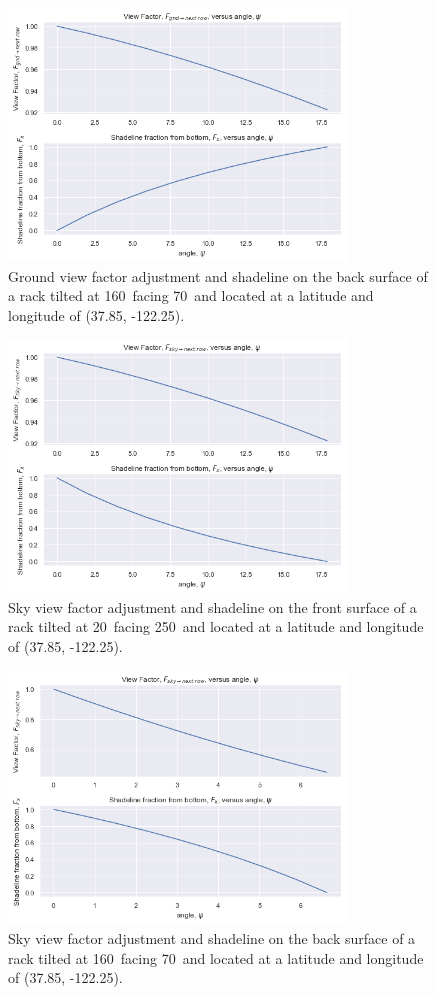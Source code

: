 \documentclass[conference]{IEEEtran}
\begin{document}
\begin{figure}
\centering
\includegraphics[width=9cm]{ground_diffuse_back_w-next_row.png}
\caption{Ground view factor adjustment and shadeline on the back surface of a rack tilted at 160\degree\ facing 70\degree\ and located at a latitude and longitude of (37.85\degree, -122.25\degree).}
\end{figure}

\begin{figure}
\centering
\includegraphics[width=9cm]{sky_diffuse_front_w-next_row.png}
\caption{Sky view factor adjustment and shadeline on the front surface of a rack tilted at 20\degree\ facing 250\degree\ and located at a latitude and longitude of (37.85\degree, -122.25\degree).}
\end{figure}

\begin{figure}
\centering
\includegraphics[width=9cm]{sky_diffuse_back_w-next_row.png}
\caption{Sky view factor adjustment and shadeline on the back surface of a rack tilted at 160\degree\ facing 70\degree\ and located at a latitude and longitude of (37.85\degree, -122.25\degree).}
\end{figure}
\end{document}
